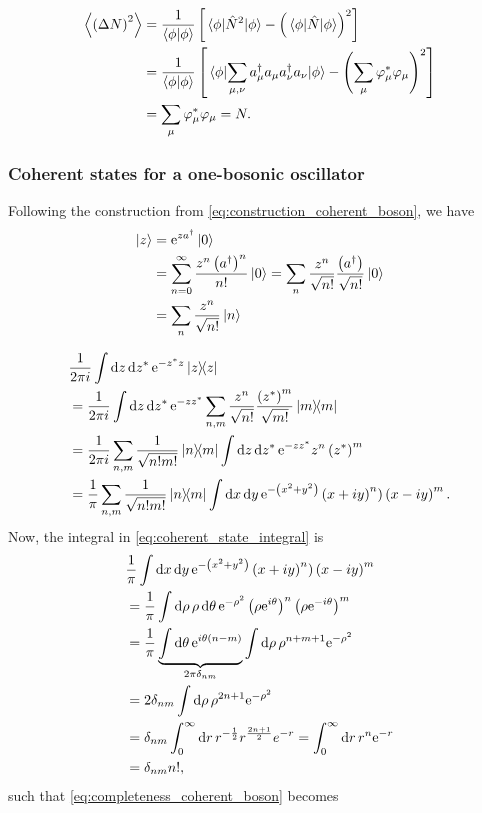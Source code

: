 \begin{align}
\ev{\left(\Delta N \right)^2} &= \frac{1}{\braket{\phi}}\left[ \ev{\hat{N}^2}{\phi} - \left( \ev{\hat{N}}{\phi}\right)^2\right] \\
&= \frac{1}{\braket{\phi}}\left[\ev{\sum_{\mu, \nu}a_\mu^\dagger a_\mu a_\nu^\dagger a_\nu}{\phi} - \left(\sum_\mu\varphi_\mu^*\varphi_\mu\right)^2\right]\\
\label{unc:expvalN2}
&= \sum_\mu\varphi_\mu^*\varphi_\mu = N.
\end{align}

\subsubsection*{Coherent states for a one-bosonic oscillator}

Following the construction from \eqref{eq:construction_coherent_boson}, we have
\begin{align}
\ket{z} &= \mathrm{e}^{za^\dagger}\ket 0 \\
&= \sum_{n=0}^\infty \frac{z^n\left(a^\dagger\right)^n}{n!}\ket{0} = \sum_n \frac{z^n}{\sqrt{n!}}\frac{\left(a^\dagger\right)}{\sqrt{n!}}\ket 0 \\
&= \sum_n\frac{z^n}{\sqrt{n!}}\ket n
\end{align}

\begin{align}
\label{eq:completeness_coherent_boson}
&\frac{1}{2\pi i}\int\dd z \dd{z^*}\e^{-z^*z}\dyad z \\
&= \frac{1}{2\pi i}\int \dd z \dd{z^*}\e^{-zz^*}\sum_{n,m}\frac{z^n}{\sqrt{n!}}\frac{\left(z^*\right)^m}{\sqrt{m!}}\dyad m \\
&= \frac{1}{2\pi i}\sum_{n, m}\frac{1}{\sqrt{n!m!}}\dyad{n}{m}\int\dd z \dd{z^*}\e^{-zz^*}z^n\left(z^*\right)^m \\
&= \frac{1}{\pi}\sum_{n, m}\frac{1}{\sqrt{n!m!}}\dyad{n}{m}\int \dd{x}\dd{y} \e^{-\left(x^2 + y^2\right)}\left(x+iy\right)^n)\left(x-iy\right)^m. \label{eq:coherent_state_integral}
\end{align}
Now, the integral in \eqref{eq:coherent_state_integral} is
\begin{align}
&\frac{1}{\pi}\int\dd{x}\dd{y}\mathrm{e}^{-\left(x^2 + y^2\right)}\left(x+iy\right)^n)\left(x-iy\right)^m \nonumber \\
&= \frac{1}{\pi} \int \dd{\rho}\rho\dd{\theta}\mathrm{e}^{-\rho^2}\left(\rho\mathrm{e}^{i\theta}\right)^n\left(\rho\mathrm{e}^{-i\theta}\right)^m\nonumber \\
&= \frac{1}{\pi}\underbrace{\int\dd{\theta}\mathrm{e}^{i\theta(n-m)}}_{2\pi\delta_{nm}}\int\dd{\rho}\rho^{n+m+1}\mathrm{e}^{-\rho^2}\nonumber \\
&= 2\delta_{nm}\int\dd{\rho}\rho^{2n+1}\mathrm{e}^{-\rho^2}\nonumber\\ 
&= \delta_{nm}\int_0^\infty\dd{r}r^{-\frac{1}{2}}r^{\frac{2n+1}{2}}e^{-r} = \int_0^\infty\dd{r}r^n\mathrm{e}^{-r} \nonumber\\
&= \delta_{nm}n!,
\end{align}
such that \eqref{eq:completeness_coherent_boson} becomes

